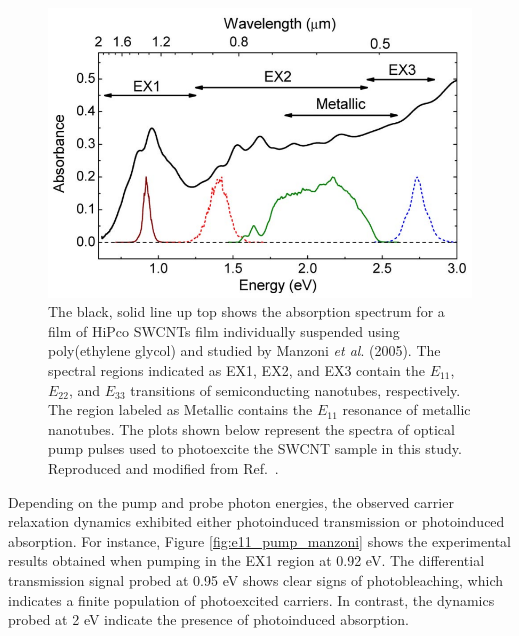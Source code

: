 \begin{figure}[ht]
	\centering
	\includegraphics[scale=0.45]{images/chapter_prior_works/abs_manzoni}
	\caption{The black, solid line up top shows the absorption spectrum for a film of HiPco SWCNTs film individually suspended using poly(ethylene glycol) and studied by Manzoni \textit{et al}. (2005). The spectral regions indicated as EX1, EX2, and EX3 contain the $E_{11}$, $E_{22}$, and $E_{33}$ transitions of semiconducting nanotubes, respectively. The region labeled as Metallic contains the $E_{11}$ resonance of metallic nanotubes. The plots shown below represent the spectra of optical pump pulses used to photoexcite the SWCNT sample in this study. Reproduced and modified from Ref.\ \cite{manzoni2005intersubband}.}
	\label{fig:abs_manzoni}
\end{figure}

Depending on the pump and probe photon energies, the observed carrier relaxation dynamics exhibited either photoinduced transmission or photoinduced absorption. For instance, Figure \ref{fig:e11_pump_manzoni} shows the experimental results obtained when pumping in the EX1 region at 0.92 eV. The differential transmission signal probed at 0.95 eV shows clear signs of photobleaching, which indicates a finite population of photoexcited carriers. In contrast, the dynamics probed at 2 eV indicate the presence of photoinduced absorption.

